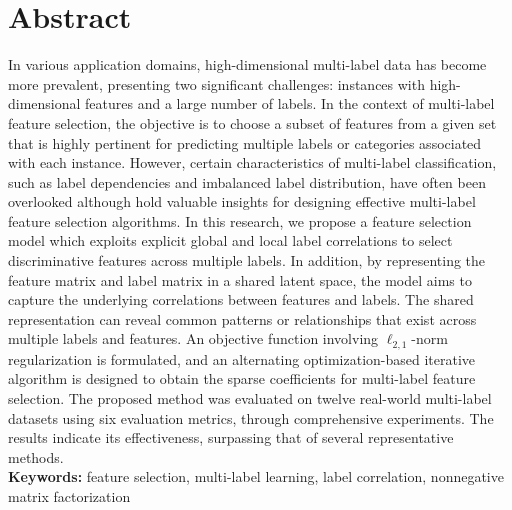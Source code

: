 


\section*{Abstract}
In various application domains, high-dimensional multi-label data has become more prevalent, presenting two significant challenges: instances with high-dimensional features and a large number of labels. In the context of multi-label feature selection, the objective is to choose a subset of features from a given set that is highly pertinent for predicting multiple labels or categories associated with each instance. However, certain characteristics of multi-label classification, such as label dependencies and imbalanced label distribution, have often been overlooked although hold valuable insights for designing effective multi-label feature selection algorithms. In this research, we propose a feature selection model which exploits explicit global and local label correlations to select discriminative features across multiple labels. In addition, by representing the feature matrix and label matrix in a shared latent space, the model aims to capture the underlying correlations between features and labels. The shared representation can reveal common patterns or relationships that exist across multiple labels and features. An objective function involving $\ell_{2,1} $-norm regularization is formulated, and an alternating optimization-based iterative algorithm is designed to obtain the sparse coefficients for multi-label feature selection. The proposed method was evaluated on twelve real-world multi-label datasets using six evaluation metrics, through comprehensive experiments. The results indicate its effectiveness, surpassing that of several representative methods.	\\
\noindent\textbf{Keywords:}
{feature selection, multi-label learning, label correlation, nonnegative matrix factorization}


